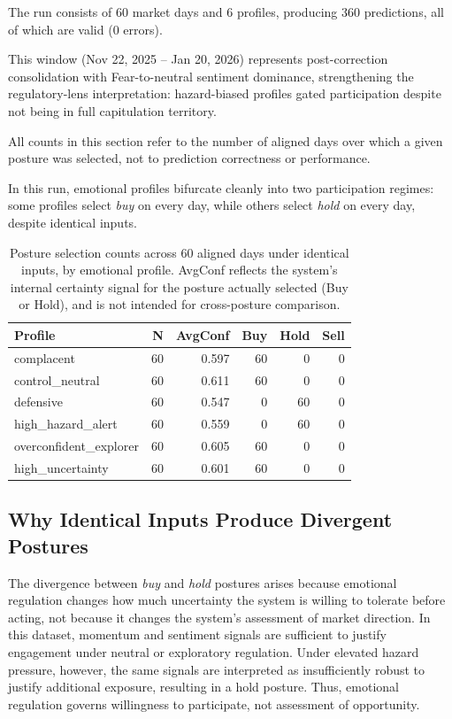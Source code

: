 \documentclass[12pt,a4paper]{report}
\begin{document}
The run consists of 60 market days and 6 profiles, producing 360 predictions, all of which are valid (0 errors).

This window (Nov 22, 2025 – Jan 20, 2026) represents post-correction consolidation with Fear-to-neutral sentiment dominance, strengthening the regulatory-lens interpretation: hazard-biased profiles gated participation despite not being in full capitulation territory.

All counts in this section refer to the number of aligned days over which a given posture was selected, not to prediction correctness or performance.

In this run, emotional profiles bifurcate cleanly into two participation regimes: some profiles select \emph{buy} on every day, while others select \emph{hold} on every day, despite identical inputs.

\begin{table}[H]
\centering
\begin{tabular}{lrrrrr}
\hline
Profile & N & AvgConf & Buy & Hold & Sell \\
\hline
complacent              & 60 & 0.597 & 60 & 0  & 0 \\
control\_neutral        & 60 & 0.611 & 60 & 0  & 0 \\
defensive               & 60 & 0.547 & 0  & 60 & 0 \\
high\_hazard\_alert     & 60 & 0.559 & 0  & 60 & 0 \\
overconfident\_explorer & 60 & 0.605 & 60 & 0  & 0 \\
high\_uncertainty       & 60 & 0.601 & 60 & 0  & 0 \\
\hline
\end{tabular}
\caption{Posture selection counts across 60 aligned days under identical inputs, by emotional profile. AvgConf reflects the system's internal certainty signal for the posture actually selected (Buy or Hold), and is not intended for cross-posture comparison.}
\label{tab:posture_dist}
\end{table}

\subsection{Why Identical Inputs Produce Divergent Postures}

The divergence between \emph{buy} and \emph{hold} postures arises because emotional regulation changes how much uncertainty the system is willing to tolerate before acting, not because it changes the system's assessment of market direction. In this dataset, momentum and sentiment signals are sufficient to justify engagement under neutral or exploratory regulation. Under elevated hazard pressure, however, the same signals are interpreted as insufficiently robust to justify additional exposure, resulting in a hold posture. Thus, emotional regulation governs willingness to participate, not assessment of opportunity.
\end{document}
